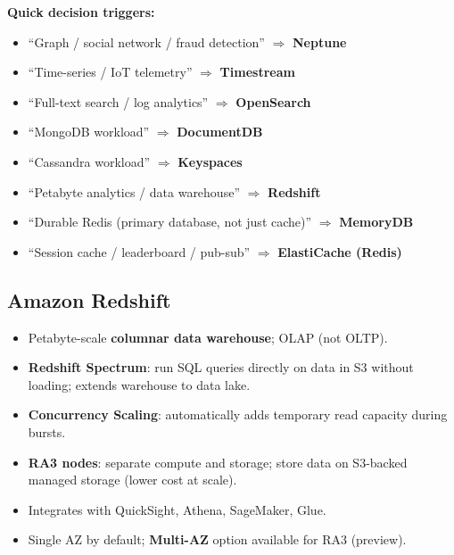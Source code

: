 \begin{examtip}
\textbf{Quick decision triggers:}
\begin{itemize}
  \item ``Graph / social network / fraud detection'' $\Rightarrow$ \textbf{Neptune}
  \item ``Time-series / IoT telemetry'' $\Rightarrow$ \textbf{Timestream}
  \item ``Full-text search / log analytics'' $\Rightarrow$ \textbf{OpenSearch}
  \item ``MongoDB workload'' $\Rightarrow$ \textbf{DocumentDB}
  \item ``Cassandra workload'' $\Rightarrow$ \textbf{Keyspaces}
  \item ``Petabyte analytics / data warehouse'' $\Rightarrow$ \textbf{Redshift}
  \item ``Durable Redis (primary database, not just cache)'' $\Rightarrow$ \textbf{MemoryDB}
  \item ``Session cache / leaderboard / pub-sub'' $\Rightarrow$ \textbf{ElastiCache (Redis)}
\end{itemize}
\end{examtip}


\subsection{Amazon Redshift}

\begin{keyfacts}
\begin{itemize}
  \item Petabyte-scale \textbf{columnar data warehouse}; OLAP (not OLTP).
  \item \textbf{Redshift Spectrum}: run SQL queries directly on data in S3 without loading;
        extends warehouse to data lake.
  \item \textbf{Concurrency Scaling}: automatically adds temporary read capacity during bursts.
  \item \textbf{RA3 nodes}: separate compute and storage; store data on S3-backed managed storage
        (lower cost at scale).
  \item Integrates with QuickSight, Athena, SageMaker, Glue.
  \item Single AZ by default; \textbf{Multi-AZ} option available for RA3 (preview).
\end{itemize}
\end{keyfacts}

